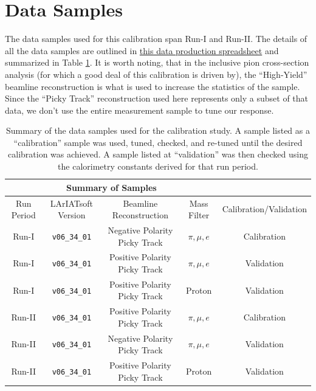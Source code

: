 \section{Data Samples}\label{sec:DataSamples}
The data samples used for this calibration span Run-I and Run-II. The details of all the data samples are outlined in \href{https://docs.google.com/spreadsheets/d/1_0kNCKBIIx53f6vopqN2OijtcTICHD9rDvN_YKGH2mI/edit?usp=sharing}{this data production spreadsheet} and summarized in Table \ref{tab:samples}. It is worth noting, that in the inclusive pion cross-section analysis (for which a good deal of this calibration is driven by), the ``High-Yield'' beamline reconstruction is what is used to increase the statistics of the sample. Since the ``Picky Track'' reconstruction used here represents only a subset of that data, we don't use the entire measurement sample to tune our response. 

\begin{center}
\begin{table}[htb]
	\begin{center}
	\begin{tabular}{c|c|c|c|c}
	\multicolumn{4}{c}{\textbf{Summary of Samples}} \\
	\hline \hline
	 Run Period & LArIATsoft Version & Beamline Reconstruction & Mass Filter & Calibration/Validation\\
	\hline
	Run-I & \verb!v06_34_01! & Negative Polarity Picky Track & $\pi, \mu, e$ & Calibration \\
	\hline
	Run-I & \verb!v06_34_01! & Positive Polarity Picky Track & $\pi, \mu, e$ & Validation \\
	\hline
	Run-I & \verb!v06_34_01! & Positive Polarity Picky Track & Proton & Validation \\
	\hline
	Run-II & \verb!v06_34_01! & Positive Polarity Picky Track & $\pi, \mu, e$ & Calibration \\
	\hline
	Run-II & \verb!v06_34_01! & Negative Polarity Picky Track & $\pi, \mu, e$ & Validation \\
	\hline
	Run-II & \verb!v06_34_01! & Positive Polarity Picky Track & Proton & Validation \\
	\hline
	\end{tabular}%
	\caption{Summary of the data samples used for the calibration study. A sample listed as a ``calibration'' sample was used, tuned, checked, and re-tuned until the desired calibration was achieved. A sample listed at ``validation'' was then checked using the calorimetry constants derived for that run period. }
	\label{tab:samples}
	\end{center}
\end{table}
\end{center}

